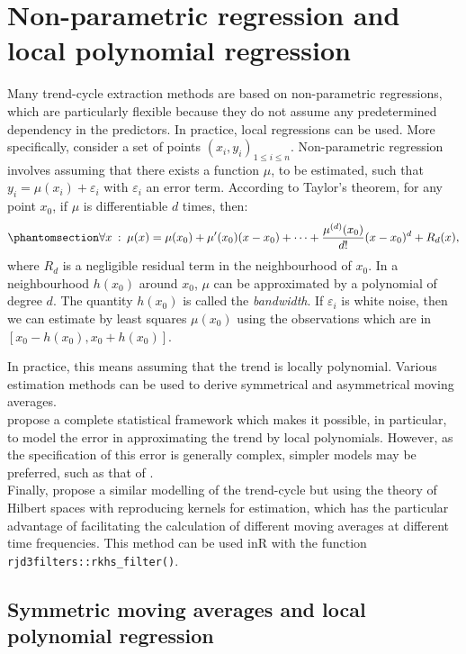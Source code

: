 \documentclass[
]{article}
\newcommand\1{\mathds{1}}
\begin{document}
\section{Non-parametric regression and local polynomial
regression}\label{sec-nonparamreg}

Many trend-cycle extraction methods are based on non-parametric
regressions, which are particularly flexible because they do not assume
any predetermined dependency in the predictors. In practice, local
regressions can be used. More specifically, consider a set of points
\((x_i,y_i)_{1\leq i\leq n}\). Non-parametric regression involves
assuming that there exists a function \(\mu\), to be estimated, such
that \(y_i=\mu(x_i)+\varepsilon_i\) with \(\varepsilon_i\) an error
term. According to Taylor's theorem, for any point \(x_0\), if \(\mu\)
is differentiable \(d\) times, then:
\begin{equation}\phantomsection\label{eq-taylor}{
\forall x \::\:\mu(x) = \mu(x_0) + \mu'(x_0)(x-x_0)+\dots +
\frac{\mu^{(d)}(x_0)}{d!}(x-x_0)^d+R_d(x),
}\end{equation} where \(R_d\) is a negligible residual term in the
neighbourhood of \(x_0\). In a neighbourhood \(h(x_0)\) around \(x_0\),
\(\mu\) can be approximated by a polynomial of degree \(d\). The
quantity \(h(x_0)\) is called the \emph{bandwidth}. If \(\varepsilon_i\)
is white noise, then we can estimate by least squares \(\mu(x_0)\) using
the observations which are in \(\left[x_0-h(x_0),x_0+h(x_0)\right]\).

In practice, this means assuming that the trend is locally polynomial.
Various estimation methods can be used to derive symmetrical and
asymmetrical moving averages.\\
\textcite{GrayThomson1996} propose a complete statistical framework
which makes it possible, in particular, to model the error in
approximating the trend by local polynomials. However, as the
specification of this error is generally complex, simpler models may be
preferred, such as that of \textcite{proietti2008}.\\
Finally, \textcite{dagumbianconcini2008} propose a similar modelling of
the trend-cycle but using the theory of Hilbert spaces with reproducing
kernels for estimation, which has the particular advantage of
facilitating the calculation of different moving averages at different
time frequencies. This method can be used inR with the function
\texttt{rjd3filters::rkhs\_filter()}.

\subsection{Symmetric moving averages and local polynomial
regression}\label{symmetric-moving-averages-and-local-polynomial-regression}
\end{document}
